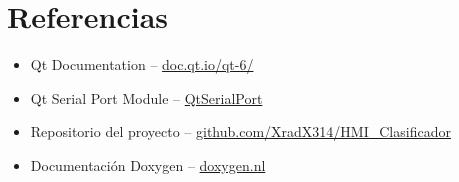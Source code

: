 \documentclass[12pt,a4paper]{report}
\begin{document}
\chapter*{Referencias}

\begin{itemize}
  \item Qt Documentation -- \href{https://doc.qt.io/qt-6/}{doc.qt.io/qt-6/}
  \item Qt Serial Port Module -- \href{https://doc.qt.io/qt-6/qtserialport-index.html}{QtSerialPort}
  \item Repositorio del proyecto -- \href{https://github.com/XradX314/HMI_Clasificador}{github.com/XradX314/HMI\_Clasificador}
  \item Documentación Doxygen -- \href{https://www.doxygen.nl/}{doxygen.nl}
\end{itemize}
\end{document}
